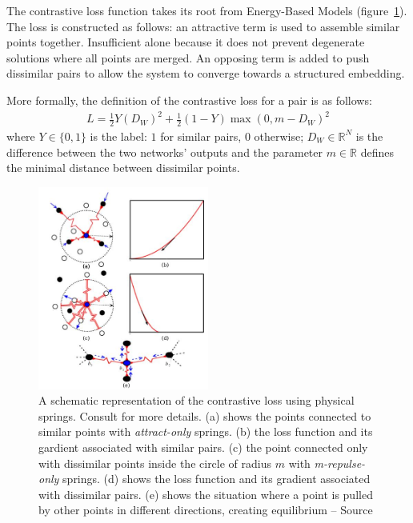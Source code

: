 \documentclass[a4paper,12pt]{report}
\newcommand{\R}{\mathbb{R}}
\begin{document}
The contrastive loss function takes its root from Energy-Based Models (figure~\ref{fig:contrastive_spring}).
The loss is constructed as follows: an attractive term is used to assemble similar points together.
Insufficient alone because it does not prevent degenerate solutions where all points are merged.
An opposing term is added to push dissimilar pairs to allow the system to converge towards a structured embedding.

More formally, the definition of the contrastive loss for a pair is as follows:
\begin{eqnarray}
    L = \frac{1}{2} Y (D_W)^2 + \frac{1}{2} (1-Y) \max(0, m - D_W)^2
\end{eqnarray}
where $Y \in \{0,1\}$ is the label: $1$ for similar pairs, $0$ otherwise; $D_W \in \R^N$ is the difference between the two networks' outputs and the parameter $m \in \R$ defines the minimal distance between dissimilar points.

\begin{figure}[t]
    \begin{center}
        \includegraphics[width=0.5\textwidth]{thesis_figures/contrastive_spring.jpg}
    \end{center}
    \caption{A schematic representation of the contrastive loss using physical springs. Consult \cite{hadsell2006dimensionality} for more details. (a) shows the points connected to similar points with {\em attract-only} springs. (b) the loss function and its gardient associated with similar pairs. (c) the point connected only with dissimilar points inside the circle of radius $m$ with {\em m-repulse-only} springs. (d) shows the loss function and its gradient associated with dissimilar pairs. (e) shows the situation where a point is pulled by other points in different directions, creating equilibrium -- Source \cite{hadsell2006dimensionality}}
    \label{fig:contrastive_spring}
\end{figure}
\end{document}
